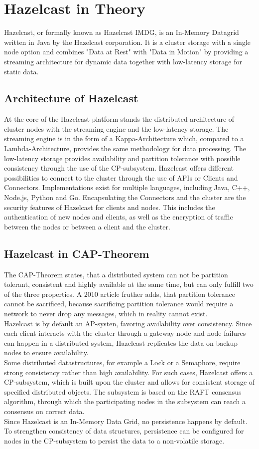 
\section{Hazelcast in Theory}
Hazelcast, or formally known as Hazelcast IMDG, is an In-Memory Datagrid written in Java by the Hazelcast corporation. It is a cluster storage with a single node option and combines "Data at Rest" with "Data in Motion" by providing a streaming architecture for dynamic data together with low-latency storage for static data.
\subsection{Architecture of Hazelcast}
At the core of the Hazelcast platform stands the distributed architecture of cluster nodes with the streaming engine and the low-latency storage. The streaming engine is in the form of a Kappa-Architecture which, compared to a Lambda-Architecture, provides the same methodology for data processing. The low-latency storage provides availability and partition tolerance with possible consistency through the use of the CP-subsystem. Hazelcast offers different possibilities to connect to the cluster through the use of APIs or Clients and Connectors. Implementations exist for multiple languages, including Java, C++, Node.js, Python and Go.
Encapsulating the Connectors and the cluster are the security features of Hazelcast for clients and nodes. This includes the authentication of new nodes and clients, as well as the encryption of traffic between the nodes or between a client and the cluster.
\subsection{Hazelcast in CAP-Theorem}
The CAP-Theorem states, that a distributed system can not be partition tolerant, consistent and highly available at the same time, but can only fulfill two of the three properties. A 2010 article fruther adds, that partition tolerance cannot be sacrificed, because sacrificing partition tolerance would require a network to never drop any messages, which in reality cannot exist.\\
Hazelcast is by default an AP-systen, favoring availability over consistency. Since each client interacts with the cluster through a gateway node and node failures can happen in a distributed system, Hazelcast replicates the data on backup nodes to ensure availability.\\ Some distributed datastructures, for example a Lock or a Semaphore, require strong consistency rather than high availability. For such cases, Hazelcast offers a CP-subsystem, which is built upon the cluster and allows for consistent storage of specified distributed objects. The subsystem is based on the RAFT consensus algorithm, through which the participating nodes in the subsystem can reach a consensus on correct data.\\
Since Hazelcast is an In-Memory Data Grid, no persistence happens by default. To strengthen consistency of data structures, persistence can be configured for nodes in the CP-subsystem to persist the data to a non-volatile storage.
